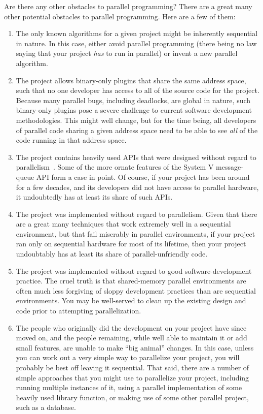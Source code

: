 \QuickQ{}
	Are there any other obstacles to parallel programming?
\QuickA{}
	There are a great many other potential obstacles to parallel
	programming.
	Here are a few of them:
	\begin{enumerate}
	\item	The only known algorithms for a given project might
		be inherently sequential in nature.
		In this case, either avoid parallel programming
		(there being no law saying that your project \emph{has}
		to run in parallel) or invent a new parallel algorithm.
	\item	The project allows binary-only plugins that share the same
		address space, such that no one developer has access to
		all of the source code for the project.
		Because many parallel bugs, including deadlocks, are
		global in nature, such binary-only plugins pose a severe
		challenge to current software development methodologies.
		This might well change, but for the time being, all
		developers of parallel code sharing a given address space
		need to be able to see \emph{all} of the code running in
		that address space.
	\item	The project contains heavily used APIs that were designed
		without regard to
		parallelism~\cite{HagitAttiya2011LawsOfOrder,Clements:2013:SCR:2517349.2522712}.
		Some of the more ornate features of the System V
		message-queue API form a case in point.
		Of course, if your project has been around for a few
		decades, and its developers did not have access to
		parallel hardware, it undoubtedly has at least
		its share of such APIs.
	\item	The project was implemented without regard to parallelism.
		Given that there are a great many techniques that work
		extremely well in a sequential environment, but that
		fail miserably in parallel environments, if your project
		ran only on sequential hardware for most of its lifetime,
		then your project undoubtably has at least its share of
		parallel-unfriendly code.
	\item	The project was implemented without regard to good
		software-development practice.
		The cruel truth is that shared-memory parallel
		environments are often much less forgiving of sloppy
		development practices than are sequential environments.
		You may be well-served to clean up the existing design
		and code prior to attempting parallelization.
	\item	The people who originally did the development on your
		project have since moved on, and the people remaining,
		while well able to maintain it or add small features,
		are unable to make ``big animal'' changes.
		In this case, unless you can work out a very simple
		way to parallelize your project, you will probably
		be best off leaving it sequential.
		That said, there are a number of simple approaches that
		you might use
		to parallelize your project, including running multiple
		instances of it, using a parallel implementation of
		some heavily used library function, or making use of
		some other parallel project, such as a database.
	\end{enumerate}

